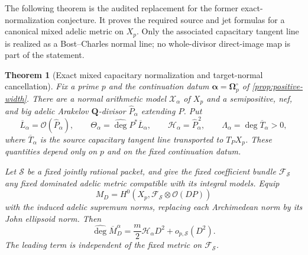 \documentclass[11pt]{article}
\newtheorem{theorem}{Theorem}[section]
\theoremstyle{definition}
\theoremstyle{remark}
\newcommand{\Q}{\mathbf Q}
\newcommand{\calF}{\mathcal F}
\newcommand{\widehatdeg}{\widehat{\deg}}
\newcommand{\Energy}{\mathscr H}
\newcommand{\LambdaAH}{\Lambda}
\begin{document}
The following theorem is the audited replacement for the former exact-normalization
conjecture.  It proves the required source and jet formulas for a canonical
mixed adelic metric on $X_p$.  Only the associated capacitary tangent line is
realized as a Bost--Charles normal line; no whole-divisor direct-image map is
part of the statement.

\begin{theorem}[Exact mixed capacitary normalization and target-normal cancellation]
\label{thm:curve-Bost-exact}
Fix a prime $p$ and the continuation datum
$\boldsymbol\alpha=\boldsymbol\Omega_p^\circ$ of
\cref{prop:positive-width}.  There are a normal arithmetic model
$\mathscr X_\alpha$ of $X_p$ and a semipositive, nef, and big adelic
Arakelov $\Q$-divisor $\widehat P_\alpha$ extending $P$.  Put
\begin{equation}\label{eq:exact-data}
 \overline L_\alpha=\mathcal O(\widehat P_\alpha),\qquad
 \Theta_\alpha=\widehatdeg P^*\overline L_\alpha,\qquad
 \Energy_\alpha=\widehat P_\alpha^{\,2},\qquad
 \LambdaAH_\alpha=\widehatdeg\overline T_\alpha>0,
\end{equation}
where $\overline T_\alpha$ is the source capacitary tangent line transported
to $T_PX_p$.  These quantities depend only on $p$ and on the fixed
continuation datum.

Let $\mathcal S$ be a fixed jointly rational packet, and give the fixed
coefficient bundle $\calF_{\mathcal S}$ any fixed dominated adelic metric
compatible with its integral models.  Equip
\[
 M_D=H^0(X_p,\calF_{\mathcal S}\otimes\mathcal O(DP))
\]
with the induced adelic supremum norms, replacing each Archimedean norm by
its John ellipsoid norm.  Then
\begin{equation}\label{eq:exact-source}
 \boxed{
 \widehatdeg\overline M_D^\alpha
 =\frac m2\Energy_\alpha D^2+o_{p,\mathcal S}(D^2).}
\end{equation}
The leading term is independent of the fixed metric on
$\calF_{\mathcal S}$.


\end{theorem}
\end{document}
